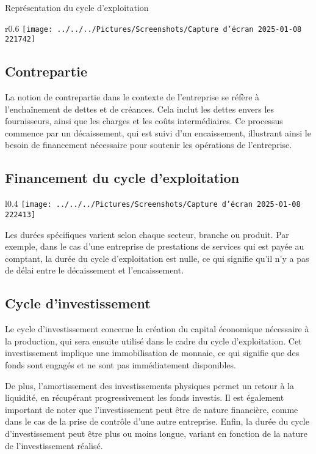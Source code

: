 \documentclass[a4paper, 12pt]{report}
\begin{document}
Représentation du cycle d'exploitation

\begin{wrapfigure}{r}{0.6\textwidth}
	\centering
\texttt{[image: ../../../Pictures/Screenshots/Capture d'écran 2025-01-08 221742]}
\end{wrapfigure}

\subsection{Contrepartie}

La notion de contrepartie dans le contexte de l'entreprise se réfère à l'enchaînement de dettes et de créances. Cela inclut les dettes envers les fournisseurs, ainsi que les charges et les coûts intermédiaires. Ce processus commence par un décaissement, qui est suivi d'un encaissement, illustrant ainsi le besoin de financement nécessaire pour soutenir les opérations de l'entreprise.
\newpage
\subsection{Financement du cycle d'exploitation}
	
\begin{wrapfigure}{l}{0.4\textwidth}
	\centering
\texttt{[image: ../../../Pictures/Screenshots/Capture d'écran 2025-01-08 222413]}
\end{wrapfigure}	
	
Les durées spécifiques varient selon chaque secteur, branche ou produit. Par exemple, dans le cas d'une entreprise de prestations de services qui est payée au comptant, la durée du cycle d'exploitation est nulle, ce qui signifie qu'il n'y a pas de délai entre le décaissement et l'encaissement.

\subsection{Cycle d'investissement}

Le cycle d'investissement concerne la création du capital économique nécessaire à la production, qui sera ensuite utilisé dans le cadre du cycle d'exploitation. Cet investissement implique une immobilisation de monnaie, ce qui signifie que des fonds sont engagés et ne sont pas immédiatement disponibles. 

De plus, l'amortissement des investissements physiques permet un retour à la liquidité, en récupérant progressivement les fonds investis. Il est également important de noter que l'investissement peut être de nature financière, comme dans le cas de la prise de contrôle d'une autre entreprise. Enfin, la durée du cycle d'investissement peut être plus ou moins longue, variant en fonction de la nature de l'investissement réalisé.
\end{document}
